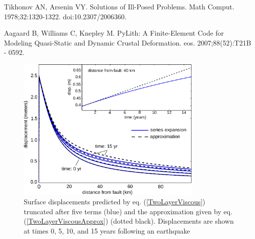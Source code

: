 \documentclass[12pt]{article}
\begin{document}
\begin{thebibliography}{}




 Tikhonov AN,
  Arsenin VY. Solutions of Ill-Posed Problems. Math
  Comput. 1978;32:1320-1322. doi:10.2307/2006360.

 Aagaard B, Williams C,
  Knepley M. PyLith: A Finite-Element Code for Modeling Quasi-Static
  and Dynamic Crustal Deformation. eos. 2007;88(52):T21B - 0592.

\end{thebibliography}



\begin{figure}[h!]\label{figure1}
  \centering
  \includegraphics[width=0.8\textwidth]{FinalFigures/Figure1.pdf}
  \caption{Surface displacements predicted by
    eq. (\ref{TwoLayerViscous}) truncated after five terms (blue) and
    the approximation given by eq. (\ref{TwoLayerViscousApprox})
    (dotted black).  Displacements are shown at times 0, 5, 10, and 15
    years following an earthquake}
  \label{figure 1}
\end{figure}
\end{document}
